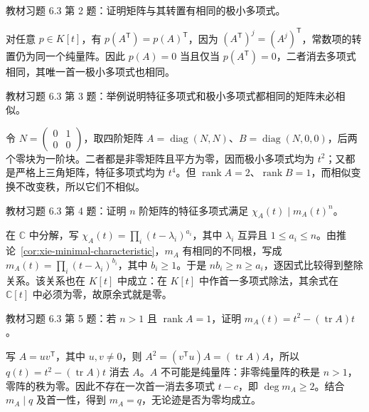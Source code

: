 \begin{example}
\label{ex:xie-63-02}
教材习题 6.3 第 2 题：证明矩阵与其转置有相同的极小多项式。
\end{example}
\begin{solve}
对任意 $p\in K[t]$，有 $p(A^{\mathsf T})=p(A)^{\mathsf T}$，因为 $(A^{\mathsf T})^j=(A^j)^{\mathsf T}$，常数项的转置仍为同一个纯量阵。因此 $p(A)=0$ 当且仅当 $p(A^{\mathsf T})=0$，二者消去多项式相同，其唯一首一极小多项式也相同。
\end{solve}

\begin{example}
\label{ex:xie-63-03}
教材习题 6.3 第 3 题：举例说明特征多项式和极小多项式都相同的矩阵未必相似。
\end{example}
\begin{solve}
令 $N=\begin{pmatrix}0&1\\0&0\end{pmatrix}$，取四阶矩阵 $A=\operatorname{diag}(N,N)$、$B=\operatorname{diag}(N,0,0)$，后两个零块为一阶块。二者都是非零矩阵且平方为零，因而极小多项式均为 $t^2$；又都是严格上三角矩阵，特征多项式均为 $t^4$。但 $\operatorname{rank}A=2$、$\operatorname{rank}B=1$，而相似变换不改变秩，所以它们不相似。
\end{solve}

\begin{example}
\label{ex:xie-63-04}
教材习题 6.3 第 4 题：证明 $n$ 阶矩阵的特征多项式满足 $\chi_A(t)\mid m_A(t)^n$。
\end{example}
\begin{solve}
在 $\mathbb C$ 中分解，写 $\chi_A(t)=\prod_i(t-\lambda_i)^{a_i}$，其中 $\lambda_i$ 互异且 $1\leq a_i\leq n$。由推论~\ref{cor:xie-minimal-characteristic}，$m_A$ 有相同的不同根，写成 $m_A(t)=\prod_i(t-\lambda_i)^{b_i}$，其中 $b_i\geq1$。于是 $nb_i\geq n\geq a_i$，逐因式比较得到整除关系。该关系也在 $K[t]$ 中成立：在 $K[t]$ 中作首一多项式除法，其余式在 $\mathbb C[t]$ 中必须为零，故原余式就是零。
\end{solve}

\begin{example}
\label{ex:xie-63-05}
教材习题 6.3 第 5 题：若 $n>1$ 且 $\operatorname{rank}A=1$，证明 $m_A(t)=t^2-(\operatorname{tr}A)t$。
\end{example}
\begin{solve}
写 $A=uv^{\mathsf T}$，其中 $u,v\ne0$，则 $A^2=(v^{\mathsf T}u)A=(\operatorname{tr}A)A$，所以 $q(t)=t^2-(\operatorname{tr}A)t$ 消去 $A$。$A$ 不可能是纯量阵：非零纯量阵的秩是 $n>1$，零阵的秩为零。因此不存在一次首一消去多项式 $t-c$，即 $\deg m_A\geq2$。结合 $m_A\mid q$ 及首一性，得到 $m_A=q$，无论迹是否为零均成立。
\end{solve}

